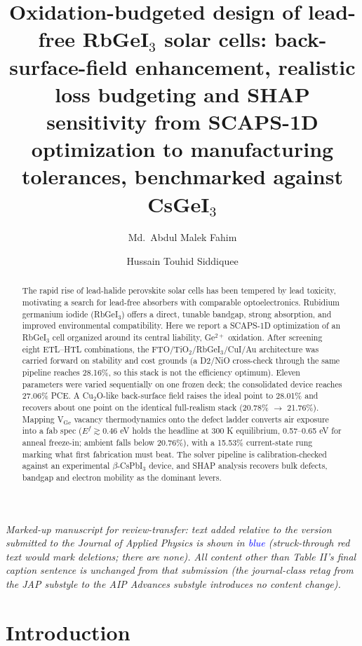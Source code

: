 \documentclass[aip,amsmath,amssymb,preprint]{revtex4-2}
\newcommand\markuplegend{\begin{center}\small\itshape Marked-up manuscript for review-transfer: text added relative to the version submitted to the Journal of Applied Physics is shown in \textcolor{blue}{blue} (struck-through red text would mark deletions; there are none). All content other than Table II's final caption sentence is unchanged from that submission (the journal-class retag from the JAP substyle to the AIP Advances substyle introduces no content change).\end{center}}
\begin{document}
\title[RbGeI3 solar cells]{Oxidation-budgeted design of lead-free RbGeI$_{3}$ solar cells: back-surface-field enhancement, realistic loss budgeting and SHAP sensitivity from SCAPS-1D optimization to manufacturing tolerances, benchmarked against CsGeI$_{3}$}
\author{Md.\ Abdul Malek Fahim}
\author{Hussain Touhid Siddiquee}
\begin{abstract}
The rapid rise of lead-halide perovskite solar cells has been tempered by lead toxicity, motivating a search for lead-free absorbers with comparable optoelectronics. Rubidium germanium iodide (RbGeI$_{3}$) offers a direct, tunable bandgap, strong absorption, and improved environmental compatibility. Here we report a SCAPS-1D optimization of an RbGeI$_{3}$ cell organized around its central liability, Ge$^{2+}$ oxidation. After screening eight ETL--HTL combinations, the FTO/\allowbreak{}TiO$_{2}$/RbGeI$_{3}$/CuI/\allowbreak{}Au architecture was carried forward on stability and cost grounds (a D2/NiO cross-check through the same pipeline reaches 28.16\%, so this stack is not the efficiency optimum). Eleven parameters were varied sequentially on one frozen deck; the consolidated device reaches 27.06\% PCE. A Cu$_{2}$O-like back-surface field raises the ideal point to 28.01\% and recovers about one point on the identical full-realism stack (20.78\% $\rightarrow$ 21.76\%). Mapping V$_{\mathrm{Ge}}$ vacancy thermodynamics onto the defect ladder converts air exposure into a fab spec ($E^f\gtrsim0.46$ eV holds the headline at 300 K equilibrium, 0.57--0.65 eV for anneal freeze-in; ambient falls below 20.76\%), with a 15.53\% current-state rung marking what first fabrication must beat. The solver pipeline is calibration-checked against an experimental $\beta$-CsPbI$_{3}$ device, and SHAP analysis recovers bulk defects, bandgap and electron mobility as the dominant levers.
\end{abstract}
\maketitle
\markuplegend
\section{Introduction}
\end{document}

